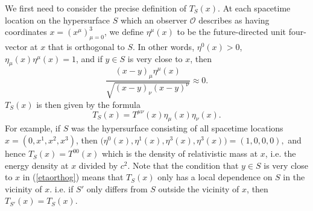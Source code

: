 \documentclass[12pt]{report}
\providecommand{\DIFaddbegin}{} %
\providecommand{\DIFaddend}{} %
\providecommand{\DIFdelbegin}{} %
\providecommand{\DIFdelend}{} %
\begin{document}
We first need to consider the precise definition of $T_S(x)$. At each spacetime location on the hypersurface $S$ which an observer $\mathcal{O}$ describes as having coordinates $x=(x^\mu)_{\mu=0}^3$, we define  $\eta^\mu(x)$ %
\DIFdelbegin %
\DIFdelend \DIFaddbegin {}\DIFaddend %
 to be the future-directed  unit four-vector at $x$ that is orthogonal to $S$. In other words, $\eta^0(x)>0$, $\eta_\mu(x)\eta^\mu(x)=1$, and if $y\in S$ is very close to $x$, then 
\begin{equation}\label{etaorthog}
\frac{(x-y)_\mu\eta^\mu(x)}{\sqrt{(x-y)_\nu(x-y)^\nu}}\approx 0.
\end{equation}$T_S(x)$ is then given by the formula 
\begin{equation}\label{TSdef}
T_S(x)=T^{\mu\nu}(x)\eta_{\mu}(x)\eta_{\nu}(x).
\end{equation}%
\DIFdelbegin %
\DIFdelend \DIFaddbegin {}\DIFaddend %
For example, if $S$ was the hypersurface consisting of all spacetime locations $x = (0,x^1,x^2,x^3)$, then $\big(\eta^{0}(x),\eta^{1}(x),\eta^{3}(x),\eta^{3}(x)\big) =(1,0,0,0),$ and hence $T_S(x)=T^{00}(x)$ which is the density of relativistic mass at $x$, i.e. the energy density at $x$ divided by $c^2$. Note that the condition that $y\in S$ is very close to $x$ in (\ref{etaorthog}) means that $T_S(x)$ only has a local dependence \label{localdependenceS} on $S$ in the vicinity of $x$. i.e. if $S'$ only differs from $S$ outside the vicinity of $x$, then  $T_{S'}(x)=T_S(x).$
\end{document}
